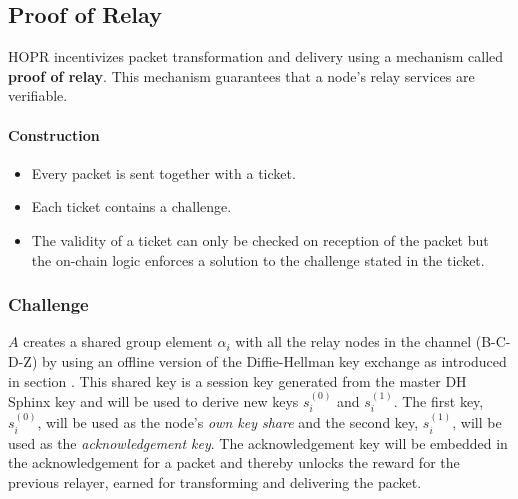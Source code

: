 \subsection{Proof of Relay}
\label{sec:proofofrelay}

HOPR incentivizes packet transformation and delivery using a mechanism called \textbf{proof of relay}. This mechanism guarantees that a node's relay services are verifiable.

\paragraph{Construction}

\begin{itemize}
    \item Every packet is sent together with a ticket.
    \item Each ticket contains a challenge.
    \item The validity of a ticket can only be checked on reception of the
        packet but the on-chain logic enforces a solution to the challenge
        stated in the ticket.

\end{itemize}

\subsubsection{Challenge}

$A$ creates a shared group element $\alpha_i$ with all the relay nodes in the channel (B-C-D-Z) by using an offline version of the Diffie-Hellman key exchange as introduced in section . This shared key is a session key generated from the master DH Sphinx key and will be used to derive new keys $s_i^{(0)}$ and $s_{i}^{(1)}$.  The first key, $s_i^{(0)}$, will be used as the node's \textit{own key share} and the second key, $s_i^{(1)}$, will be used as the \textit{acknowledgement key}. The acknowledgement key will be embedded in the acknowledgement for a packet and thereby unlocks the reward for the previous relayer, earned for transforming and delivering the packet.

